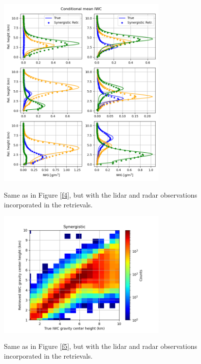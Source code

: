 \documentclass{ametsocV6.1}
\begin{document}
\begin{figure}[t]
    \centering
    \includegraphics[width=0.75\textwidth,angle=0]{./Figs/fig08.rev.png}\\
    \caption{Same as in Figure \ref{f4}, but with the lidar and radar observations incorporated in the
    retrievals.}\label{f8}
\end{figure}

\begin{figure}[t]
    \centering
    \includegraphics[width=0.75\textwidth,angle=0]{./Figs/fig09.rev.png}\\
    \caption{Same as in Figure \ref{f5}, but with the lidar and radar observations incorporated in the
    retrievals.}\label{f9}
\end{figure}
\end{document}
